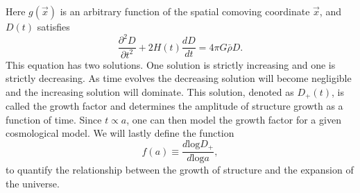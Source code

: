 Here $g(\vec{x})$ is an arbitrary function of the spatial comoving coordinate
$\vec{x}$, and $D(t)$ satisfies
\begin{equation}\label{eq:growthfacD}
    \frac{\partial^2 D}{\partial t^2} + 2H(t) \frac{d D}{dt}=4\pi G\bar{\rho}D.
\end{equation}
This equation has two solutions. One solution is strictly increasing and one is
strictly decreasing. As time evolves the decreasing solution will become negligible
and the increasing solution will dominate. This solution, denoted as $D_+(t)$,
is called the growth factor and determines the amplitude of structure growth as
a function of time. Since $t\propto a$, one can then model the growth factor for
a given cosmological model. We will lastly define the function
\begin{equation}\label{eq:growthfac}
    f(a) \equiv \frac{d\mathrm{ log} D_+}{d\mathrm{log} a},
\end{equation}
to quantify the relationship between the growth of structure and the expansion
of the universe.
